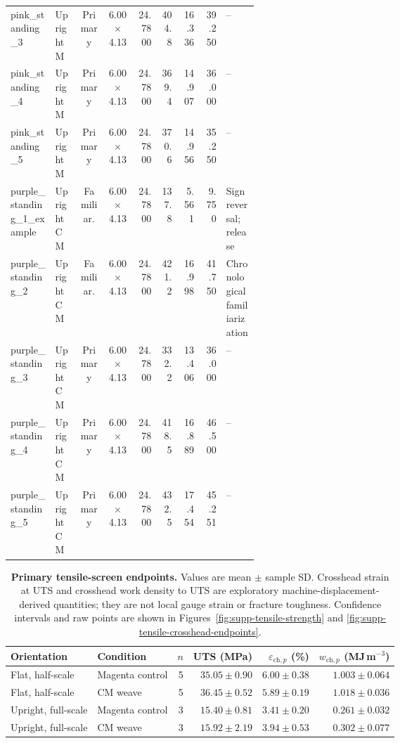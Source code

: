\documentclass[preprint,12pt,authoryear]{elsarticle}
\begin{document}
{\begin{longtable}{@{}p{0.18\linewidth}p{0.10\linewidth}c c r r r r p{0.13\linewidth}@{}}
pink\_standing\_3 & Upright M & Primary & 6.00$\times$4.13 & 24.7800 & 404.8 & 16.336 & 39.250 & -- \\
pink\_standing\_4 & Upright M & Primary & 6.00$\times$4.13 & 24.7800 & 369.4 & 14.907 & 36.000 & -- \\
pink\_standing\_5 & Upright M & Primary & 6.00$\times$4.13 & 24.7800 & 370.6 & 14.956 & 35.250 & -- \\
purple\_standing\_1\_example & Upright CM & Familiar. & 6.00$\times$4.13 & 24.7800 & 137.8 & 5.561 & 9.750 & Sign reversal; release \\
purple\_standing\_2 & Upright CM & Familiar. & 6.00$\times$4.13 & 24.7800 & 421.2 & 16.998 & 41.750 & Chronological familiarization \\
purple\_standing\_3 & Upright CM & Primary & 6.00$\times$4.13 & 24.7800 & 332.2 & 13.406 & 36.000 & -- \\
purple\_standing\_4 & Upright CM & Primary & 6.00$\times$4.13 & 24.7800 & 418.5 & 16.889 & 46.500 & -- \\
purple\_standing\_5 & Upright CM & Primary & 6.00$\times$4.13 & 24.7800 & 432.5 & 17.454 & 45.251 & -- \\
\end{longtable}
}

\begin{table}[H]
\centering
\caption{\textbf{Primary tensile-screen endpoints.}
Values are mean \(\pm\) sample SD. Crosshead strain at UTS and crosshead work density to UTS are exploratory machine-displacement-derived quantities; they are not local gauge strain or fracture toughness. Confidence intervals and raw points are shown in Figures~\ref{fig:supp-tensile-strength} and \ref{fig:supp-tensile-crosshead-endpoints}.}
\small
\setlength{\tabcolsep}{5pt}
\begin{tabular}{llrrrr}
\toprule
Orientation & Condition & \(n\) & UTS (MPa) & \(\varepsilon_{\mathrm{ch},p}\) (\%) & \(w_{\mathrm{ch},p}\) (MJ\,m\(^{-3}\)) \\
\midrule
Flat, half-scale & Magenta control & 5 & \(35.05 \pm 0.90\) & \(6.00 \pm 0.38\) & \(1.003 \pm 0.064\) \\
Flat, half-scale & CM weave & 5 & \(36.45 \pm 0.52\) & \(5.89 \pm 0.19\) & \(1.018 \pm 0.036\) \\
Upright, full-scale & Magenta control & 3 & \(15.40 \pm 0.81\) & \(3.41 \pm 0.20\) & \(0.261 \pm 0.032\) \\
Upright, full-scale & CM weave & 3 & \(15.92 \pm 2.19\) & \(3.94 \pm 0.53\) & \(0.302 \pm 0.077\) \\
\bottomrule
\end{tabular}
\label{tab:supp-tensile-endpoints}
\end{table}
\end{document}
